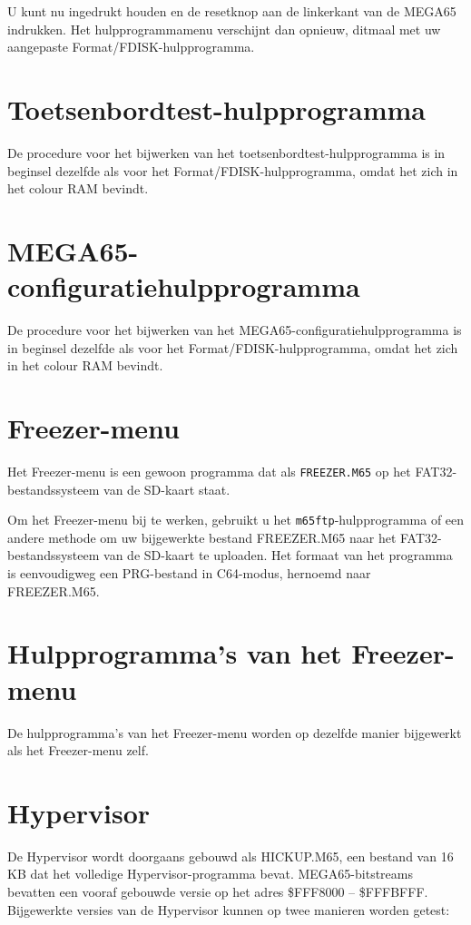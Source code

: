U kunt nu  ingedrukt houden en de resetknop aan de linkerkant van de MEGA65 indrukken. Het hulpprogrammamenu verschijnt dan opnieuw, ditmaal met uw aangepaste Format/FDISK-hulpprogramma.

\section{Toetsenbordtest-hulpprogramma}

De procedure voor het bijwerken van het toetsenbordtest-hulpprogramma is in beginsel dezelfde als voor het Format/FDISK-hulpprogramma, omdat het zich in het colour RAM bevindt.

\section{MEGA65-configuratiehulpprogramma}

De procedure voor het bijwerken van het MEGA65-configuratiehulpprogramma is in beginsel dezelfde als voor het Format/FDISK-hulpprogramma, omdat het zich in het colour RAM bevindt.

\section{Freezer-menu}

Het Freezer-menu is een gewoon programma dat als {\tt FREEZER.M65} op het FAT32-bestandssysteem van de SD-kaart staat.

Om het Freezer-menu bij te werken, gebruikt u het {\tt m65ftp}-hulpprogramma of een andere methode om uw bijgewerkte bestand FREEZER.M65 naar het FAT32-bestandssysteem van de SD-kaart te uploaden. Het formaat van het programma is eenvoudigweg een PRG-bestand in C64-modus, hernoemd naar FREEZER.M65.

\section{Hulpprogramma's van het Freezer-menu}

De hulpprogramma's van het Freezer-menu worden op dezelfde manier bijgewerkt als het Freezer-menu zelf.

\section{Hypervisor}

De Hypervisor wordt doorgaans gebouwd als HICKUP.M65, een bestand van 16 KB dat het volledige Hypervisor-programma bevat. MEGA65-bitstreams bevatten een vooraf gebouwde versie op het adres \$FFF8000 -- \$FFFBFFF. Bijgewerkte versies van de Hypervisor kunnen op twee manieren worden getest:

